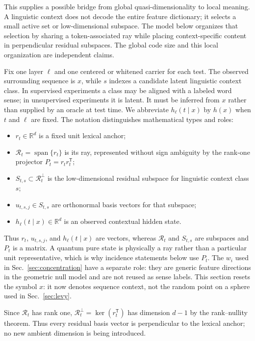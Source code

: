 \documentclass[
  aps,
  reprint,
  superscriptaddress,
  floatfix,
  nofootinbib,
  longbibliography
]{revtex4-2}
\newcommand{\R}{\mathbb{R}}
\newcommand{\T}{^{\mathsf{T}}}
\DeclareMathOperator{\spanop}{span}
\begin{document}
This supplies a possible bridge from global quasi-dimensionality to local
meaning.  A linguistic context does not decode the entire feature dictionary;
it selects a small active set or low-dimensional subspace.  The model below
organizes that selection by sharing a token-associated ray while placing
context-specific content in perpendicular residual subspaces.  The global code
size and this local organization are independent claims.

Fix one layer $\ell$ and one centered or whitened carrier for each test.  The
observed surrounding sequence is $x$, while $s$ indexes a candidate latent
linguistic context class.  In supervised experiments a class may be aligned with a
labeled word sense; in unsupervised experiments it is latent.  It must be
inferred from $x$ rather than supplied by an oracle at test time.  We
abbreviate $h_\ell(t\mid x)$ by $h(x)$ when $t$ and $\ell$ are fixed.  The
notation distinguishes mathematical types and roles:
%
\begin{itemize}
\item $r_t\in\R^d$ is a fixed unit lexical anchor;
\item $\mathcal R_t=\spanop\{r_t\}$ is its ray, represented without sign
  ambiguity by the rank-one projector $P_t=r_t r_t\T$;
\item $S_{t,s}\subset\mathcal R_t^\perp$ is the low-dimensional residual
  subspace for linguistic context class $s$;
\item $u_{t,s,j}\in S_{t,s}$ are orthonormal basis vectors for that subspace;
\item $h_\ell(t\mid x)\in\R^d$ is an observed contextual hidden state.
\end{itemize}
%
Thus $r_t$, $u_{t,s,j}$, and $h_\ell(t\mid x)$ are vectors, whereas
$\mathcal R_t$ and $S_{t,s}$ are subspaces and $P_t$ is a matrix.  A quantum
pure state is physically a ray rather than a particular unit representative,
which is why incidence statements below use $P_t$.  The $w_i$ used in
Sec.~\ref{sec:concentration} have a separate role: they are generic feature
directions in the geometric null model and are not reused as sense labels.
This section resets the symbol $x$: it now denotes sequence context, not the
random point on a sphere used in Sec.~\ref{sec:levy}.

Since $\mathcal R_t$ has rank one,
$\mathcal R_t^\perp=\ker(r_t\T)$ has dimension $d-1$ by the rank--nullity
theorem.  Thus every residual basis vector is perpendicular to the lexical
anchor; no new ambient dimension is being introduced.
\end{document}
